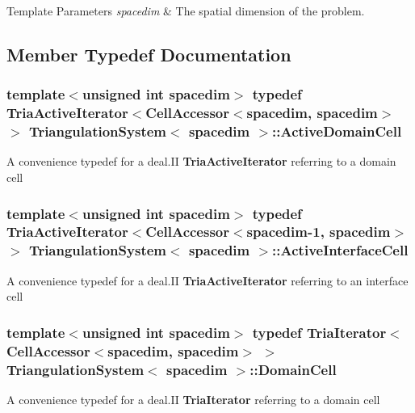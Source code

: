 \begin{DoxyTemplParams}{Template Parameters}
{\em spacedim} & The spatial dimension of the problem. \\
\hline
\end{DoxyTemplParams}


\subsection{Member Typedef Documentation}
\subsubsection[{\texorpdfstring{Active\+Domain\+Cell}{ActiveDomainCell}}]{\setlength{\rightskip}{0pt plus 5cm}template$<$unsigned int spacedim$>$ typedef {\bf Tria\+Active\+Iterator}$<${\bf Cell\+Accessor}$<$spacedim, spacedim$>$ $>$ {\bf Triangulation\+System}$<$ spacedim $>$\+::{\bf Active\+Domain\+Cell}}\hypertarget{class_triangulation_system_a6aa358f6803facdc7e7ee72698a5f4cb}{}\label{class_triangulation_system_a6aa358f6803facdc7e7ee72698a5f4cb}
A convenience typedef for a deal.\+II {\bf Tria\+Active\+Iterator} referring to a domain cell 
\subsubsection[{\texorpdfstring{Active\+Interface\+Cell}{ActiveInterfaceCell}}]{\setlength{\rightskip}{0pt plus 5cm}template$<$unsigned int spacedim$>$ typedef {\bf Tria\+Active\+Iterator}$<${\bf Cell\+Accessor}$<$spacedim-\/1, spacedim$>$ $>$ {\bf Triangulation\+System}$<$ spacedim $>$\+::{\bf Active\+Interface\+Cell}}\hypertarget{class_triangulation_system_a4c3f97884b5478ebd6771433c5273ac5}{}\label{class_triangulation_system_a4c3f97884b5478ebd6771433c5273ac5}
A convenience typedef for a deal.\+II {\bf Tria\+Active\+Iterator} referring to an interface cell 
\subsubsection[{\texorpdfstring{Domain\+Cell}{DomainCell}}]{\setlength{\rightskip}{0pt plus 5cm}template$<$unsigned int spacedim$>$ typedef {\bf Tria\+Iterator}$<${\bf Cell\+Accessor}$<$spacedim, spacedim$>$ $>$ {\bf Triangulation\+System}$<$ spacedim $>$\+::{\bf Domain\+Cell}}\hypertarget{class_triangulation_system_af53de5ec80a16d9cb167660b2832b240}{}\label{class_triangulation_system_af53de5ec80a16d9cb167660b2832b240}
A convenience typedef for a deal.\+II {\bf Tria\+Iterator} referring to a domain cell 
